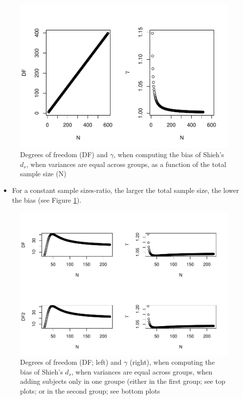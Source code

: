 \documentclass[
  man]{apa6}
\providecommand{\tightlist}{%
  \setlength{\itemsep}{0pt}\setlength{\parskip}{0pt}}
\begin{document}
\begin{figure}
\centering
\includegraphics{Theoretical-Bias-of-all-estimators-as-a-function-of-population-parameters_files/figure-latex/biasshiehhomNsize2-1.pdf}
\caption{\label{fig:biasshiehhomNsize2}Degrees of freedom (DF) and \(\gamma\), when computing the bias of Shieh's \(d_s\), when variances are equal across groups, as a function of the total sample size (N)}
\end{figure}

\begin{itemize}
\tightlist
\item
  For a constant sample sizes-ratio, the larger the total sample size, the lower the bias (see Figure \ref{fig:biasshiehhomNsize2}).
\end{itemize}

\begin{figure}
\centering
\includegraphics{Theoretical-Bias-of-all-estimators-as-a-function-of-population-parameters_files/figure-latex/biasshiehhomNsize4-1.pdf}
\caption{\label{fig:biasshiehhomNsize4}Degrees of freedom (DF; left) and \(\gamma\) (right), when computing the bias of Shieh's \(d_s\), when variances are equal across groups, when adding subjects only in one groupe (either in the first group; see top plots; or in the second group; see bottom plots}
\end{figure}
\end{document}

